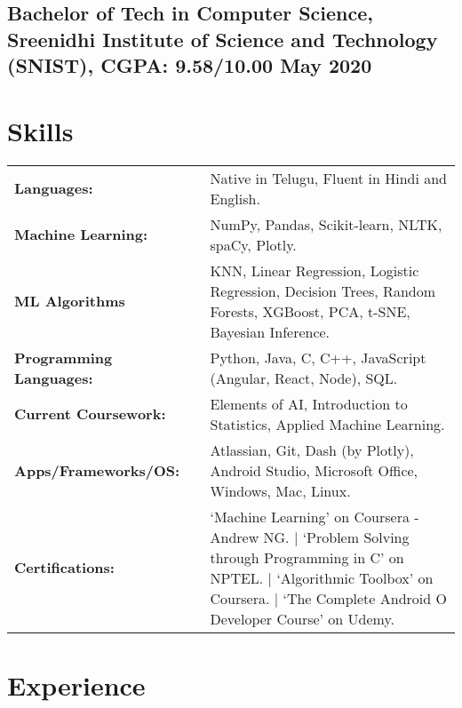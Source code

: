 \documentclass[a4,10pt]{article}
\newcommand{\hskills}[1]{
\textbf{\bfseries #1} }
\begin{document}
\subsection*{Bachelor of Tech in Computer Science, {\normalsize \normalfont Sreenidhi Institute of Science and Technology (SNIST), CGPA: 9.58/10.00} \hfill May 2020} 
\vspace{0.2cm}



\section{Skills}
\begin{tabular}{p{11em} p{1em} p{43em}}
\hskills{Languages:} &  & Native in Telugu, Fluent in Hindi and English. \\
\hskills{Machine Learning:} &  & NumPy, Pandas, Scikit-learn, NLTK, spaCy, Plotly. \\
\hskills{ML Algorithms} &  & KNN, Linear Regression, Logistic Regression, Decision Trees, Random Forests, XGBoost, PCA, t-SNE, Bayesian Inference. \\
\hskills{Programming Languages:}&  &  Python, Java, C, C++, JavaScript (Angular, React, Node), SQL.  \\
\hskills{Current Coursework:} &  &  Elements of AI, Introduction to Statistics, Applied Machine Learning.  \\
\hskills{Apps/Frameworks/OS:} &  & Atlassian, Git, Dash (by Plotly), Android Studio, Microsoft Office, Windows, Mac, Linux.   \\
\hskills{Certifications:} &  & ‘Machine Learning’ on Coursera - Andrew NG. | ‘Problem Solving through Programming in C’ on NPTEL. | ‘Algorithmic Toolbox’ on Coursera. | ‘The Complete Android O Developer Course’ on Udemy. \\
\end{tabular}
\vspace{-0.2cm}




\section{Experience}
\end{document}
